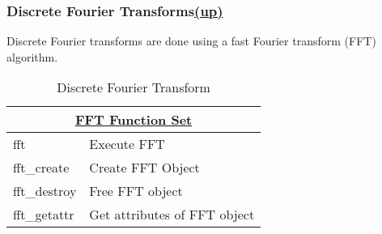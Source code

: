 \subsubsection*{Discrete Fourier Transforms\hspace*{\fill}\hyperlink{SignalProcessing}{(up)}\hypertarget{fftFunctions}{}} 
Discrete Fourier transforms are done using a fast Fourier transform (FFT) algorithm. 
\begin{table}[H]
\caption{Discrete Fourier Transform}
\label{tab:fftFunctions}
\begin{center}
\begin{tabular}{|l|l|}
\multicolumn{2}{c}{\hyperlink{fftFunc}{\rmfamily \bfseries FFT Function Set}} \\ \hline
fft & Execute FFT\\
fft\_create & Create FFT Object\\
fft\_destroy & Free FFT object\\
fft\_getattr & Get attributes of FFT object\\
\hline\end{tabular}
\end{center}
\label{default}
\end{table}%